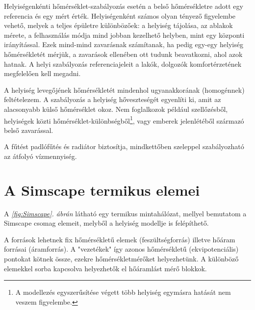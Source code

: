 



%
%
%
%


Helyiségenkénti hőmérséklet-szabályozás esetén a belső hőmérsékletre adott egy referencia és egy mért érték.
Helyiségenként számos olyan tényező figyelembe vehető, melyek a teljes épületre különbözőek: a helyiség tájolása, az ablakok mérete, a felhasználás módja mind jobban kezelhető helyben, mint egy központi irányítással. Ezek mind-mind zavarásnak számítanak, ha pedig egy-egy helyiség hőmérsékletét mérjük, a zavarások ellenében ott tudunk beavatkozni, ahol azok hatnak. A helyi szabályozás referenciajeleit a lakók, dolgozók komfortérzetének megfelelően kell megadni.

A helyiség levegőjének hőmérsékletét mindenhol ugyanakkorának (homogénnek) feltételezem. A szabályozás a helyiség hőveszteségét egyenlíti ki, amit az alacsonyabb külső hőmérséklet okoz. Nem foglalkozok például szellőzésből, helyiségek közti hő\-mér\-sék\-let-különbségből\footnote{A modellezés egyszerűsítése végett több helyiség egymásra hatását nem veszem figyelembe.}, vagy emberek jelenlétéből származó belső zavarással.

A fűtést padlófűtés és radiátor biztosítja, mindkettőben szeleppel szabályozható az átfolyó vízmennyiség.

\section{A Simscape termikus elemei}

A \textit{\ref{fig:Simscape}. ábrán} látható egy termikus mintahálózat, mellyel bemutatom a Simscape csomag elemeit, melyből a helyiség modellje is felépíthető.

A források lehetnek fix hőmérsékletű elemek (feszültségforrás) illetve hőáram forrásai (áramforrás).
A "vezetékek" így azonos hőmérsékletű (ekvipotenciális) pontokat kötnek össze, ezekre hőmérsékletmérőket helyezhetünk. A különböző elemekkel sorba kapcsolva helyezhetők el hőáramlást mérő blokkok.

